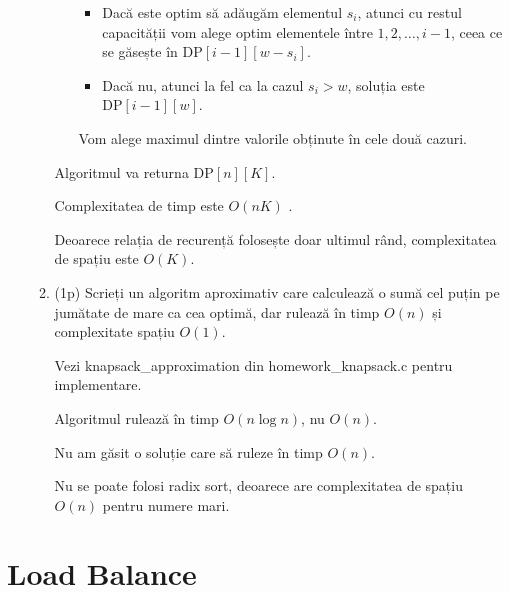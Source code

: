 \documentclass[a4paper,12pt]{article}
\newcommand*{\DP}{\text{DP}}
\begin{document}
\begin{enumerate}
\begin{enumerate}
\begin{itemize}
\begin{itemize}

\item
Dacă este optim să adăugăm elementul $s_i$, atunci cu restul capacității
vom alege optim elementele între $1, 2, \dots, i - 1$, ceea ce se găsește
în $\DP[i - 1][w - s_i]$.

\item
Dacă nu, atunci la fel ca la cazul $s_i > w$,
soluția este $\DP[i - 1][w]$.

\end{itemize}

Vom alege maximul dintre valorile obținute în cele două cazuri.

\end{itemize}

Algoritmul va returna $\DP[n][K]$.

Complexitatea de timp este $O(nK)$ .

Deoarece relația de recurență folosește doar ultimul rând, complexitatea de spațiu este $O(K)$.

\item (1p)
Scrieți un algoritm aproximativ care calculează o sumă cel puțin pe
jumătate de mare ca cea optimă, dar rulează în timp $O(n)$ și complexitate spațiu $O(1)$.

Vezi knapsack\_approximation din homework\_knapsack.c pentru implementare.

Algoritmul rulează în timp $O(n \log n)$, nu $O(n)$.

Nu am găsit o soluție care să ruleze în timp $O(n)$.

Nu se poate folosi radix sort, deoarece are complexitatea de spațiu $O(n)$
pentru numere mari.

\end{enumerate}

\end{enumerate}


\section{Load Balance}
\end{document}
